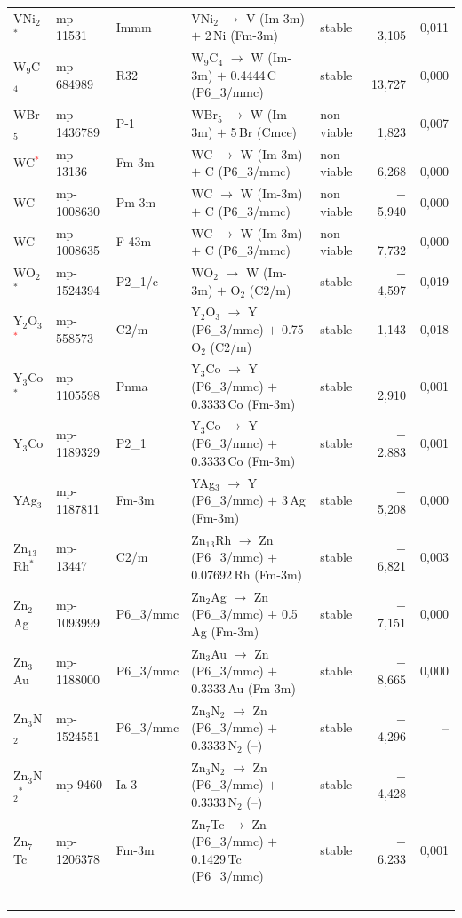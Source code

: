 \begin{longtable}{@{}ll l@{\hspace{4pt}} p{4.6cm} l@{\hspace{4pt}} rr@{}}
VNi$_{2}$$^*$ & mp-11531 & Immm & VNi$_{2}$ $\to$ V (Im-3m) $+$ 2\,Ni (Fm-3m) & stable & $-$3{,}105 & 0{,}011 \\
W$_{9}$C$_{4}$ & mp-684989 & R32 & W$_{9}$C$_{4}$ $\to$ W (Im-3m) $+$ 0.4444\,C (P6\_3/mmc) & stable & $-$13{,}727 & 0{,}000 \\
WBr$_{5}$ & mp-1436789 & P-1 & WBr$_{5}$ $\to$ W (Im-3m) $+$ 5\,Br (Cmce) & non viable & $-$1{,}823 & 0{,}007 \\
WC\textcolor{red}{$^*$} & mp-13136 & Fm-3m & WC $\to$ W (Im-3m) $+$ C (P6\_3/mmc) & non viable & $-$6{,}268 & $-$0{,}000 \\
WC & mp-1008630 & Pm-3m & WC $\to$ W (Im-3m) $+$ C (P6\_3/mmc) & non viable & $-$5{,}940 & 0{,}000 \\
WC & mp-1008635 & F-43m & WC $\to$ W (Im-3m) $+$ C (P6\_3/mmc) & non viable & $-$7{,}732 & 0{,}000 \\
WO$_{2}$$^*$ & mp-1524394 & P2\_1/c & WO$_{2}$ $\to$ W (Im-3m) $+$ O$_{2}$ (C2/m) & stable & $-$4{,}597 & 0{,}019 \\
Y$_{2}$O$_{3}$\textcolor{red}{$^*$} & mp-558573 & C2/m & Y$_{2}$O$_{3}$ $\to$ Y (P6\_3/mmc) $+$ 0.75\,O$_{2}$ (C2/m) & stable & 1{,}143 & 0{,}018 \\
Y$_{3}$Co$^*$ & mp-1105598 & Pnma & Y$_{3}$Co $\to$ Y (P6\_3/mmc) $+$ 0.3333\,Co (Fm-3m) & stable & $-$2{,}910 & 0{,}001 \\
Y$_{3}$Co & mp-1189329 & P2\_1 & Y$_{3}$Co $\to$ Y (P6\_3/mmc) $+$ 0.3333\,Co (Fm-3m) & stable & $-$2{,}883 & 0{,}001 \\
YAg$_{3}$ & mp-1187811 & Fm-3m & YAg$_{3}$ $\to$ Y (P6\_3/mmc) $+$ 3\,Ag (Fm-3m) & stable & $-$5{,}208 & 0{,}000 \\
Zn$_{13}$Rh$^*$ & mp-13447 & C2/m & Zn$_{13}$Rh $\to$ Zn (P6\_3/mmc) $+$ 0.07692\,Rh (Fm-3m) & stable & $-$6{,}821 & 0{,}003 \\
Zn$_{2}$Ag & mp-1093999 & P6\_3/mmc & Zn$_{2}$Ag $\to$ Zn (P6\_3/mmc) $+$ 0.5\,Ag (Fm-3m) & stable & $-$7{,}151 & 0{,}000 \\
Zn$_{3}$Au & mp-1188000 & P6\_3/mmc & Zn$_{3}$Au $\to$ Zn (P6\_3/mmc) $+$ 0.3333\,Au (Fm-3m) & stable & $-$8{,}665 & 0{,}000 \\
Zn$_{3}$N$_{2}$ & mp-1524551 & P6\_3/mmc & Zn$_{3}$N$_{2}$ $\to$ Zn (P6\_3/mmc) $+$ 0.3333\,N$_{2}$ (--) & stable & $-$4{,}296 & -- \\
Zn$_{3}$N$_{2}$$^*$ & mp-9460 & Ia-3 & Zn$_{3}$N$_{2}$ $\to$ Zn (P6\_3/mmc) $+$ 0.3333\,N$_{2}$ (--) & stable & $-$4{,}428 & -- \\
Zn$_{7}$Tc & mp-1206378 & Fm-3m & Zn$_{7}$Tc $\to$ Zn (P6\_3/mmc) $+$ 0.1429\,Tc (P6\_3/mmc) & stable & $-$6{,}233 & 0{,}001 \\
$$
\end{longtable}
